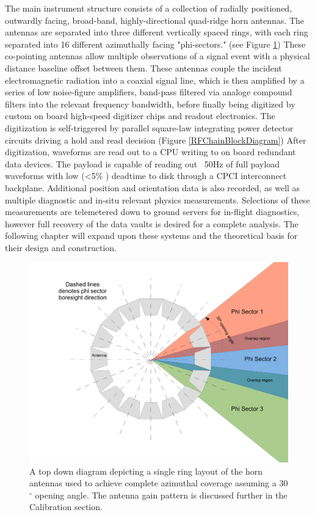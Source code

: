 	The main instrument structure consists of a collection of radially positioned, outwardly facing, broad-band, highly-directional quad-ridge horn antennas.  The antennas are separated into three different vertically spaced rings, with each ring separated into 16 different azimuthally facing "phi-sectors." (see Figure \ref{fig:phiSectors})    These co-pointing antennas allow multiple observations of a signal event with a physical distance baseline offset between them. These antennas couple the incident electromagnetic radiation into a coaxial signal line, which is then amplified by a series of low noise-figure amplifiers, band-pass filtered via analoge compound filters into the relevant frequency bandwidth, before finally being digitized by custom on board high-speed digitizer chips and readout electronics.  The digitization is self-triggered by parallel square-law integrating power detector circuits driving a hold and read decision (Figure \ref{RFChainBlockDiagram}) After digitization, waveforms are read out to a CPU writing to on board redundant data devices.  The payload is capable of reading out ~50Hz of full payload waveforms with low (\textless 5\% ) deadtime to disk through a CPCI interconnect backplane.  Additional position and orientation data is also recorded, as well as multiple diagnostic and in-situ relevant physics measurements.  Selections of these measurements are telemetered down to ground servers for in-flight diagnostics, however full recovery of the data vaults is desired for a complete analysis.  The following chapter will expand upon these systems and the theoretical basis for their design and construction.
	
	
\begin{figure}
\centering
	\includegraphics[width=\textwidth]{figures/phiSectors}
	\caption{A top down diagram depicting a single ring layout of the horn antennas used to achieve complete azimuthal coverage assuming a 30$^{\circ}$  opening angle.  The antenna gain pattern is discussed further in the Calibration section.}
	\label{fig:phiSectors}
\end{figure}

